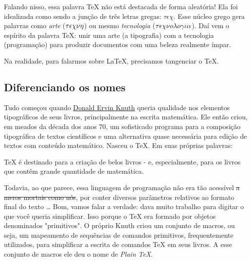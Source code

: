 Falando nisso, essa palavra \TeX{} não está destacada de forma aleatória! 
Ela foi idealizada como sendo a junção de três letras gregas: $\tau\epsilon\chi$.
Esse núcleo grego gera palavras como \textit{arte} ($\small\tau\epsilon\chi\nu\eta$) 
ou mesmo \textit{tecnologia} ($\small\tau\epsilon\chi\nu o \lambda o \gamma\iota\alpha$).
Daí vem o espírito da palavra \TeX: unir uma arte (a tipografia) com a 
tecnologia (programação) para produzir documentos com uma beleza realmente ímpar.

Na realidade, para falarmos sobre \LaTeX, precisamos tangenciar o \TeX.

\subsection{Diferenciando os nomes} %

Tudo começou quando \href{https://pt.wikipedia.org/wiki/Donald_Knuth}{Donald Ervin Knuth} 
queria qualidade nos elementos tipográficos de seus livros, principalmente na 
escrita matemática. 
Ele então criou, em meados da década dos anos 70, um sofisticado programa para a 
composição tipográfica de textos científicos e uma alternativa quase necessária 
para edição de textos com conteúdo matemático. 
Nasceu o \TeX. 
Em suas próprias palavras:

\begin{cita}
  \TeX{} é destinado para a criação de belos livros - e, especialmente, para os 
  livros que contêm grande quantidade de matemática.
\end{cita}

Todavia, ao que parece, essa linguagem de programação não era tão acessível 
\sout{a meros mortais como nós}, por conter diversos parâmetros relativos ao 
formato final do texto \ldots
Bom, vamos falar a verdade: dava muito trabalho para digitar o que você queria 
simplificar.
Isso porque o \TeX{} era formado por objetos denominados "primitivos".
O próprio Knuth criou um conjunto de macros, ou seja, um mapeamento de sequências de comandos primitivos, frequentemente 
utilizados, para simplificar a escrita de comandos \TeX{} em seus livros.
A esse conjunto de macros ele deu o nome de \textit{Plain \TeX}.

